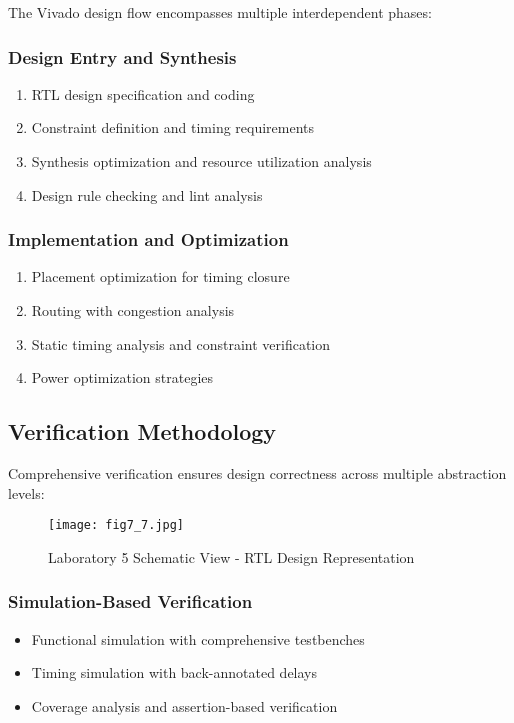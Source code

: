 \documentclass[11pt,a4paper]{article}
\begin{document}
The Vivado design flow encompasses multiple interdependent phases:

\subsubsection{Design Entry and Synthesis}
\begin{enumerate}[leftmargin=*]
    \item RTL design specification and coding
    \item Constraint definition and timing requirements
    \item Synthesis optimization and resource utilization analysis
    \item Design rule checking and lint analysis
\end{enumerate}

\subsubsection{Implementation and Optimization}
\begin{enumerate}[leftmargin=*]
    \item Placement optimization for timing closure
    \item Routing with congestion analysis
    \item Static timing analysis and constraint verification
    \item Power optimization strategies
\end{enumerate}

\subsection{Verification Methodology}

Comprehensive verification ensures design correctness across multiple abstraction levels:

\begin{figure}[H]
    \centering
    \texttt{[image: fig7\_7.jpg]}
    \caption{Laboratory 5 Schematic View - RTL Design Representation}
    \label{fig:lab5_schematic}
\end{figure}

\subsubsection{Simulation-Based Verification}
\begin{itemize}[leftmargin=*]
    \item Functional simulation with comprehensive testbenches
    \item Timing simulation with back-annotated delays
    \item Coverage analysis and assertion-based verification
\end{itemize}
\end{document}
